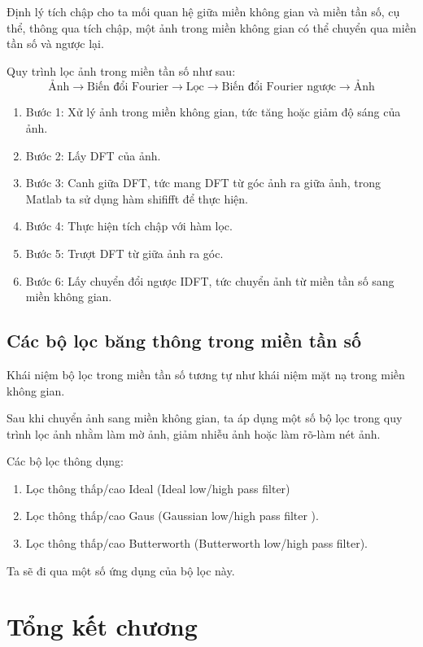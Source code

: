 \documentclass[12pt,a4paper]{report}
\numberwithin{equation}{section}
\theoremstyle{definition} %
\begin{document}
Định lý tích chập cho ta mối quan hệ giữa miền không gian và miền tần số, cụ thể, thông qua tích chập, một ảnh trong miền không gian có thể chuyển qua miền tần số và ngược lại.

Quy trình lọc ảnh trong miền tần số như sau:
\[\text{Ảnh}\rightarrow\text{Biến đổi Fourier}\rightarrow\text{Lọc}\rightarrow\text{Biến đổi Fourier ngược}
\rightarrow\text{Ảnh}\]
\begin{enumerate}
\item Bước 1: Xử lý ảnh trong miền không gian, tức tăng hoặc giảm độ sáng của ảnh.
\item Bước 2: Lấy DFT của ảnh.
\item Bước 3: Canh giữa DFT, tức mang DFT từ góc ảnh ra giữa ảnh, trong Matlab ta sử dụng hàm shififft để thực hiện.
\item Bước 4: Thực hiện tích chập với hàm lọc.
\item Bước 5: Trượt DFT từ giữa ảnh ra góc.
\item Bước 6: Lấy chuyển đổi ngược IDFT, tức chuyển ảnh từ miền tần số sang miền không gian.
\end{enumerate}
\subsection{Các bộ lọc băng thông trong miền tần số}

Khái niệm bộ lọc trong miền tần số tương tự như khái niệm mặt nạ trong miền không gian.

Sau khi chuyển ảnh sang miền không gian, ta áp dụng một số bộ lọc trong quy trình lọc ảnh nhằm làm mờ ảnh, giảm nhiễu ảnh hoặc làm rõ-làm nét ảnh.

Các bộ lọc thông dụng:
\begin{enumerate}
\item Lọc thông thấp/cao Ideal (Ideal low/high pass filter)
\item Lọc thông thấp/cao Gaus (Gaussian low/high pass filter
).

\item Lọc thông thấp/cao Butterworth (Butterworth low/high pass filter).



\end{enumerate}

Ta sẽ đi qua một số ứng dụng của bộ lọc này.

\section{Tổng kết chương}
\end{document}
